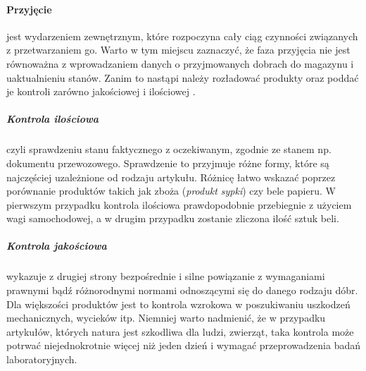 		\paragraph{Przyjęcie} jest wydarzeniem zewnętrznym, które rozpoczyna cały ciąg czynności związanych z przetwarzaniem go.
		Warto w tym miejscu zaznaczyć, że faza przyjęcia nie jest równoważna z wprowadzaniem danych o przyjmowanych
		dobrach do magazynu i uaktualnieniu stanów. Zanim to nastąpi należy rozładować produkty oraz poddać je kontroli
		zarówno jakościowej i ilościowej \cite{PL_FM}.
			\subparagraph{Kontrola ilościowa} czyli sprawdzeniu stanu faktycznego z oczekiwanym, zgodnie ze stanem np. dokumentu przewozowego. 
			Sprawdzenie to przyjmuje różne formy, które są najczęściej uzależnione od rodzaju artykułu. Różnicę łatwo wskazać
			poprzez porównanie produktów takich jak zboża (\textit{produkt sypki}) czy bele papieru. W pierwszym przypadku 
			kontrola ilościowa prawdopodobnie przebiegnie z użyciem wagi samochodowej, a w drugim przypadku zostanie zliczona
			ilość sztuk beli.  
			\subparagraph{Kontrola jakościowa} wykazuje z drugiej strony bezpośrednie i silne powiązanie z wymaganiami prawnymi bądź
			różnorodnymi normami odnoszącymi się do danego rodzaju dóbr. Dla większości produktów jest to kontrola
			wzrokowa w poszukiwaniu uszkodzeń mechanicznych, wycieków itp. Niemniej warto nadmienić, że w przypadku
			artykułów, których natura jest szkodliwa dla ludzi, zwierząt, taka kontrola może potrwać niejednokrotnie
			więcej niż jeden dzień i wymagać przeprowadzenia badań laboratoryjnych.
